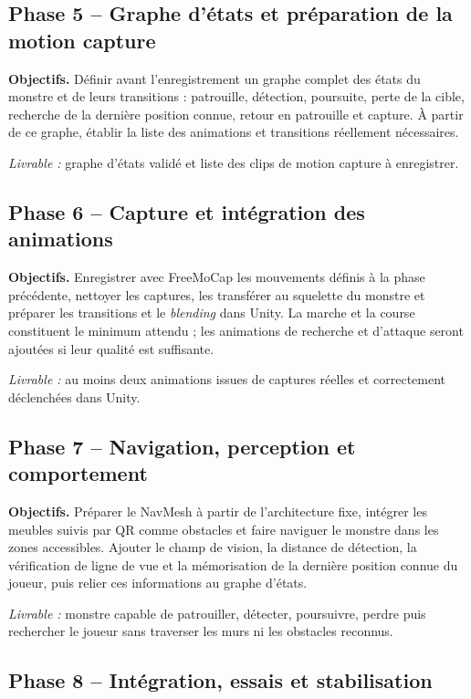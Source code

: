 \documentclass[11pt,a4paper]{article}
\begin{document}
\subsection*{Phase 5 -- Graphe d'états et préparation de la motion capture}

\textbf{Objectifs.} Définir avant l'enregistrement un graphe complet des états du monstre et de leurs transitions : patrouille, détection, poursuite, perte de la cible, recherche de la dernière position connue, retour en patrouille et capture. À partir de ce graphe, établir la liste des animations et transitions réellement nécessaires.

\textit{Livrable :} graphe d'états validé et liste des clips de motion capture à enregistrer.

\subsection*{Phase 6 -- Capture et intégration des animations}

\textbf{Objectifs.} Enregistrer avec FreeMoCap les mouvements définis à la phase précédente, nettoyer les captures, les transférer au squelette du monstre et préparer les transitions et le \emph{blending} dans Unity. La marche et la course constituent le minimum attendu ; les animations de recherche et d'attaque seront ajoutées si leur qualité est suffisante.

\textit{Livrable :} au moins deux animations issues de captures réelles et correctement déclenchées dans Unity.

\subsection*{Phase 7 -- Navigation, perception et comportement}

\textbf{Objectifs.} Préparer le NavMesh à partir de l'architecture fixe, intégrer les meubles suivis par QR comme obstacles et faire naviguer le monstre dans les zones accessibles. Ajouter le champ de vision, la distance de détection, la vérification de ligne de vue et la mémorisation de la dernière position connue du joueur, puis relier ces informations au graphe d'états.

\textit{Livrable :} monstre capable de patrouiller, détecter, poursuivre, perdre puis rechercher le joueur sans traverser les murs ni les obstacles reconnus.

\subsection*{Phase 8 -- Intégration, essais et stabilisation}
\end{document}
